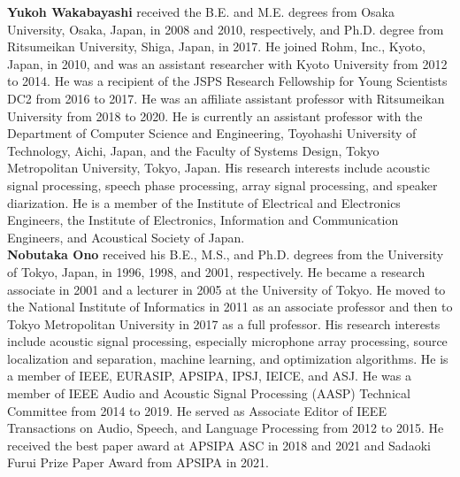 \documentclass[sip,biber]{now-journal}
\begin{document}
\noindent\normalsize\textbf{Yukoh Wakabayashi}
received the B.E. and M.E. degrees from Osaka University, Osaka, Japan, in 2008 and 2010, respectively, and Ph.D. degree from Ritsumeikan University, Shiga, Japan, in 2017.
He joined Rohm, Inc., Kyoto, Japan, in 2010, and was an assistant researcher with Kyoto University from 2012 to 2014.
He was a recipient of the JSPS Research Fellowship for Young Scientists DC2 from 2016 to 2017.
He was an affiliate assistant professor with Ritsumeikan University from 2018 to 2020.
He is currently an assistant professor with the Department of Computer Science and Engineering, Toyohashi University of Technology, Aichi, Japan, and the Faculty of Systems Design, Tokyo Metropolitan University, Tokyo, Japan.
His research interests include acoustic signal processing, speech phase processing, array signal processing, and speaker diarization.
He is a member of the Institute of Electrical and Electronics Engineers, the Institute of Electronics, Information and Communication Engineers, and Acoustical Society of Japan.
\\

\noindent\normalsize\textbf{Nobutaka Ono}
received his B.E., M.S., and Ph.D. degrees from the University of Tokyo, Japan, in 1996, 1998, and 2001, respectively.
He became a research associate in 2001 and a lecturer in 2005 at the University of Tokyo.
He moved to the National Institute of Informatics in 2011 as an associate professor and then to Tokyo Metropolitan University in 2017 as a full professor.
His research interests include acoustic signal processing, especially microphone array processing, source localization and separation, machine learning, and optimization algorithms.
He is a member of IEEE, EURASIP, APSIPA, IPSJ, IEICE, and ASJ.
He was a member of IEEE Audio and Acoustic Signal Processing (AASP) Technical Committee from 2014 to 2019.
He served as Associate Editor of IEEE Transactions on Audio, Speech, and Language Processing from 2012 to 2015.
He received the best paper award at APSIPA ASC in 2018 and 2021 and Sadaoki Furui Prize Paper Award from APSIPA in 2021.

\printbibliography
\end{document}
